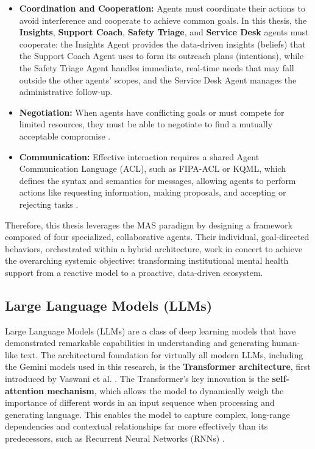\begin{itemize}
    \item \textbf{Coordination and Cooperation:} Agents must coordinate their actions to avoid interference and cooperate to achieve common goals. In this thesis, the \textbf{Insights}, \textbf{Support Coach}, \textbf{Safety Triage}, and \textbf{Service Desk} agents must cooperate: the Insights Agent provides the data-driven insights (beliefs) that the Support Coach Agent uses to form its outreach plans (intentions), while the Safety Triage Agent handles immediate, real-time needs that may fall outside the other agents' scopes, and the Service Desk Agent manages the administrative follow-up.
    \item \textbf{Negotiation:} When agents have conflicting goals or must compete for limited resources, they must be able to negotiate to find a mutually acceptable compromise \cite{paurobally2002rationalagents, agerri2006unifiedcommunication}.
    \item \textbf{Communication:} Effective interaction requires a shared Agent Communication Language (ACL), such as FIPA-ACL or KQML, which defines the syntax and semantics for messages, allowing agents to perform actions like requesting information, making proposals, and accepting or rejecting tasks \cite{fornara2003interaction, williams2025multicommunication}.
\end{itemize}

Therefore, this thesis leverages the MAS paradigm by designing a framework composed of four specialized, collaborative agents. Their individual, goal-directed behaviors, orchestrated within a hybrid architecture, work in concert to achieve the overarching systemic objective: transforming institutional mental health support from a reactive model to a proactive, data-driven ecosystem.

\subsection{Large Language Models (LLMs)}
\label{subsec:llms}

Large Language Models (LLMs) are a class of deep learning models that have demonstrated remarkable capabilities in understanding and generating human-like text. The architectural foundation for virtually all modern LLMs, including the Gemini models used in this research, is the \textbf{Transformer architecture}, first introduced by Vaswani et al. \cite{vaswani2017attention}. The Transformer's key innovation is the \textbf{self-attention mechanism}, which allows the model to dynamically weigh the importance of different words in an input sequence when processing and generating language. This enables the model to capture complex, long-range dependencies and contextual relationships far more effectively than its predecessors, such as Recurrent Neural Networks (RNNs) \cite{liu2023transformersurvey, vaswani2017comparisonrnn}.

